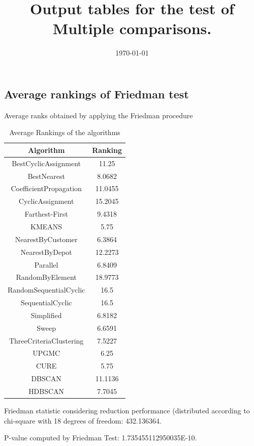 \documentclass[a4paper,10pt]{article}
\title{Output tables for the test of Multiple comparisons.}
\author{}
\date{\today}
\begin{document}
\begin{landscape}
\pagestyle{empty}
\maketitle
\thispagestyle{empty}
\section{Average rankings of Friedman test}



Average ranks obtained by applying the Friedman procedure

\begin{table}[!htp]
\centering
\begin{tabular}{|c|c|}\hline
Algorithm&Ranking\\\hline
BestCyclicAssignment & 11.25\\
BestNearest & 8.0682\\
CoefficientPropagation & 11.0455\\
CyclicAssignment & 15.2045\\
Farthest-First & 9.4318\\
KMEANS & 5.75\\
NearestByCustomer & 6.3864\\
NearestByDepot & 12.2273\\
Parallel & 6.8409\\
RandomByElement & 18.9773\\
RandomSequentialCyclic & 16.5\\
SequentialCyclic & 16.5\\
Simplified & 6.8182\\
Sweep & 6.6591\\
ThreeCriteriaClustering & 7.5227\\
UPGMC & 6.25\\
CURE & 5.75\\
DBSCAN & 11.1136\\
HDBSCAN & 7.7045\\
\hline
\end{tabular}
\caption{Average Rankings of the algorithms}
\end{table}

Friedman statistic considering reduction performance (distributed according to chi-square with 18 degrees of freedom: 432.136364.

P-value computed by Friedman Test: 1.735455112950035E-10.\newline


\end{landscape}
\end{document}
